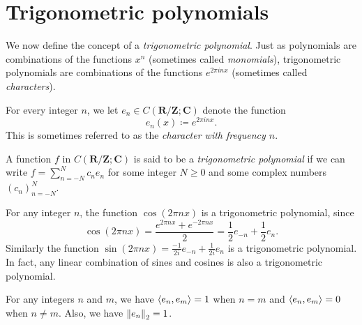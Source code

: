 \section{Trigonometric polynomials}\label{sec 5.3}

\begin{note}
    We now define the concept of a \emph{trigonometric polynomial}.
    Just as polynomials are combinations of the functions \(x^n\) (sometimes called \emph{monomials}), trigonometric polynomials are combinations of the functions \(e^{2 \pi i n x}\) (sometimes called \emph{characters}).
\end{note}

\begin{definition}[Characters]\label{5.3.1}
    For every integer \(n\), we let \(e_n \in C(\mathbf{R} / \mathbf{Z} ; \mathbf{C})\) denote the function
    \[
        e_n(x) \coloneqq e^{2 \pi i n x}.
    \]
    This is sometimes referred to as the \emph{character with frequency \(n\)}.
\end{definition}

\begin{definition}\label{5.3.2}
    A function \(f\) in \(C(\mathbf{R} / \mathbf{Z} ; \mathbf{C})\) is said to be a \emph{trigonometric polynomial} if we can write
    \(f = \sum_{n = -N}^N c_n e_n\) for some integer \(N \geq 0\) and some complex numbers \((c_n)_{n = -N}^N\).
\end{definition}

\setcounter{theorem}{3}
\begin{example}\label{5.3.4}
    For any integer \(n\), the function \(\cos(2 \pi n x)\) is a trigonometric polynomial, since
    \[
        \cos(2 \pi n x) = \frac{e^{2 \pi n x} + e^{- 2 \pi n x}}{2} = \frac{1}{2} e_{-n} + \frac{1}{2} e_n.
    \]
    Similarly the function \(\sin(2 \pi n x) = \frac{-1}{2i} e_{-n} + \frac{1}{2i} e_n\) is a trigonometric polynomial.
    In fact, any linear combination of sines and cosines is also a trigonometric polynomial.
\end{example}

\begin{lemma}\label{5.3.5}
    For any integers \(n\) and \(m\), we have \(\inner*{e_n, e_m} = 1\) when \(n = m\) and \(\inner*{e_n, e_m} = 0\) when \(n \neq m\).
    Also, we have \(\norm*{e_n}_2 = 1\).
\end{lemma}

